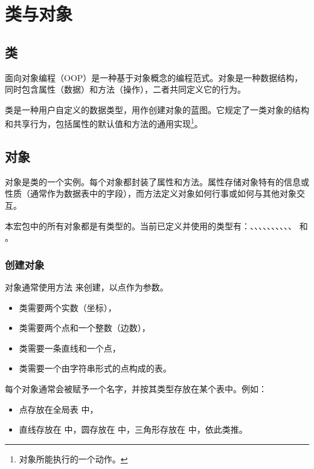 \newpage

\section{类与对象}
\label{sec:class_and_object}

\subsection{类}

面向对象编程（OOP）是一种基于对象概念的编程范式。对象是一种数据结构，同时包含属性（数据）和方法（操作），二者共同定义它的行为。

\vspace{1em}
类是一种用户自定义的数据类型，用作创建对象的蓝图。它规定了一类对象的结构和共享行为，包括属性的默认值和方法的通用实现\footnote{对象所能执行的一个动作。}。

\subsection{对象}
对象是类的一个实例。每个对象都封装了属性和方法。属性存储对象特有的信息或性质（通常作为数据表中的字段），而方法定义对象如何行事或如何与其他对象交互。


\vspace{1em}
 本宏包中的所有对象都是有类型的。当前已定义并使用的类型有：、、、、、、、、、、 和 。


\subsubsection{创建对象}
对象通常使用方法  来创建，以点作为参数。

\begin{itemize}
  \item {} 类需要两个实数（坐标），
  \item {} 类需要两个点和一个整数（边数），
  \item {} 类需要一条直线和一个点，
  \item {} 类需要一个由字符串形式的点构成的表。
\end{itemize}

每个对象通常会被赋予一个名字，并按其类型存放在某个表中。例如：
\begin{itemize}
  \item 点存放在全局表  中，
  \item 直线存放在  中，圆存放在  中，三角形存放在  中，依此类推。
\end{itemize}

